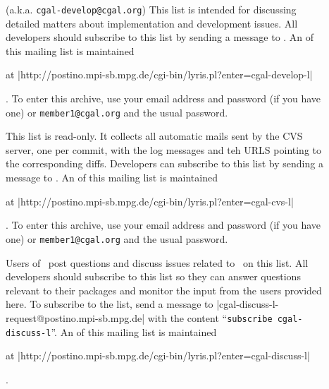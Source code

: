 \begin{description}
\item[] 
     (a.k.a. \texttt{cgal-develop@cgal.org})
     This list is intended for discussing detailed matters 
     about implementation and development issues.  All developers should 
     subscribe to this list by sending a message to
     .
     An  
     of this mailing list is maintained%
     \begin{ccTexOnly}
     at \nonlinkedpath|http://postino.mpi-sb.mpg.de/cgi-bin/lyris.pl?enter=cgal-develop-l|
     \end{ccTexOnly}.  To enter this archive, use your email address and
     password (if you have one) or
     \texttt{member1@cgal.org} and the usual password.  

\item[] 
     This list is read-only.  It collects all automatic mails sent by
     the CVS server, one per commit, with the log messages and teh URLS
     pointing to the corresponding diffs.
     Developers can subscribe to this list by sending a message to
     .
     An  
     of this mailing list is maintained%
     \begin{ccTexOnly}
     at \nonlinkedpath|http://postino.mpi-sb.mpg.de/cgi-bin/lyris.pl?enter=cgal-cvs-l|
     \end{ccTexOnly}.  To enter this archive, use your email address and
     password (if you have one) or
     \texttt{member1@cgal.org} and the usual password.  

\item[] 
     Users of \cgal\ post questions and discuss issues
     related to \cgal\ on this list.  All developers should subscribe to this 
     list so they can answer questions relevant to their packages and monitor 
     the input from the users provided here. 
     To subscribe to the list, send a message to
     {\nonlinkedpath|cgal-discuss-l-request@postino.mpi-sb.mpg.de|}
     with the content ``\texttt{subscribe cgal-discuss-l}''.
     An  
     of this mailing list is maintained%
     \begin{ccTexOnly}
     at \nonlinkedpath|http://postino.mpi-sb.mpg.de/cgi-bin/lyris.pl?enter=cgal-discuss-l|
     \end{ccTexOnly}.


\end{description}
